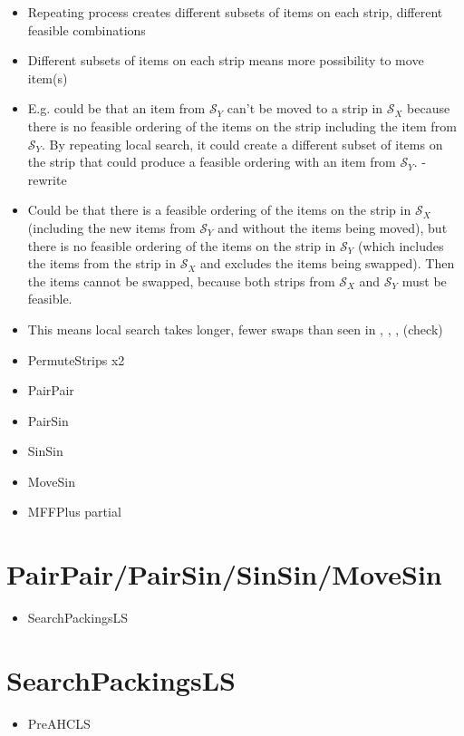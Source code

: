\documentclass{elsarticle}
\begin{document}
\begin{itemize}
	\item Repeating process creates different subsets of items on each strip, different feasible combinations
	\item Different subsets of items on each strip means more possibility to move item(s)
	\item E.g. could be that an item from $\mathcal{S}_Y$ can't be moved to a strip in $\mathcal{S}_X$ because there is no feasible ordering of the items on the strip including the item from $\mathcal{S}_Y$. By repeating local search, it could create a different subset of items on the strip that could produce a feasible ordering with an item from $\mathcal{S}_Y$. - rewrite
	\item Could be that there is a feasible ordering of the items on the strip in $\mathcal{S}_X$ (including the new items from $\mathcal{S}_Y$ and without the items being moved), but there is no feasible ordering of the items on the strip in $\mathcal{S}_Y$ (which includes the items from the strip in $\mathcal{S}_X$ and excludes the items being swapped). Then the items cannot be swapped, because both strips from $\mathcal{S}_X$ and $\mathcal{S}_Y$ must be feasible. 
	\item This means local search takes longer, fewer swaps than seen in \cite{lewis2009}, \cite{lewis2017}, \cite{levine2004}, \cite{falkenauer1996} (check)
\end{itemize}
\begin{itemize}
	\item PermuteStrips x2
	\item PairPair
	\item PairSin
	\item SinSin
	\item MoveSin
	\item MFFPlus partial
\end{itemize}

\section{PairPair/PairSin/SinSin/MoveSin}
\begin{itemize}
	\item SearchPackingsLS
\end{itemize}

\section{SearchPackingsLS}
\begin{itemize}
	\item PreAHCLS
\end{itemize}
\end{document}
